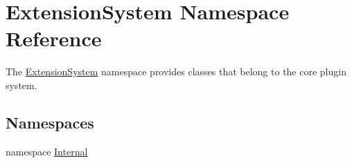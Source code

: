 \hypertarget{namespace_extension_system}{\section{Extension\-System Namespace Reference}
\label{namespace_extension_system}
}


The \hyperlink{namespace_extension_system}{Extension\-System} namespace provides classes that belong to the core plugin system.  


\subsection*{Namespaces}
\begin{DoxyCompactItemize}
\item 
namespace \hyperlink{namespace_extension_system_1_1_internal}{Internal}
\end{DoxyCompactItemize}
